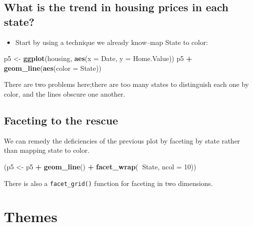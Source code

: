 \documentclass[]{book}
\newenvironment{Shaded}{\begin{snugshade}}{\end{snugshade}}
\newcommand{\KeywordTok}[1]{\textcolor[rgb]{0.13,0.29,0.53}{\textbf{#1}}}
\newcommand{\DataTypeTok}[1]{\textcolor[rgb]{0.13,0.29,0.53}{#1}}
\newcommand{\DecValTok}[1]{\textcolor[rgb]{0.00,0.00,0.81}{#1}}
\newcommand{\StringTok}[1]{\textcolor[rgb]{0.31,0.60,0.02}{#1}}
\newcommand{\OperatorTok}[1]{\textcolor[rgb]{0.81,0.36,0.00}{\textbf{#1}}}
\newcommand{\NormalTok}[1]{#1}
\providecommand{\tightlist}{%
  \setlength{\itemsep}{0pt}\setlength{\parskip}{0pt}}
\begin{document}
\subsection{What is the trend in housing prices in each
state?}\label{what-is-the-trend-in-housing-prices-in-each-state}

\begin{itemize}
\tightlist
\item
  Start by using a technique we already know--map State to color:
\end{itemize}

\begin{Shaded}
\begin{Highlighting}[]
\NormalTok{p5 <-}\StringTok{ }\KeywordTok{ggplot}\NormalTok{(housing, }\KeywordTok{aes}\NormalTok{(}\DataTypeTok{x =}\NormalTok{ Date, }\DataTypeTok{y =}\NormalTok{ Home.Value))}
\NormalTok{p5 }\OperatorTok{+}\StringTok{ }\KeywordTok{geom_line}\NormalTok{(}\KeywordTok{aes}\NormalTok{(}\DataTypeTok{color =}\NormalTok{ State))  }
\end{Highlighting}
\end{Shaded}

There are two problems here;there are too many states to distinguish
each one by color, and the lines obscure one another.

\subsection{Faceting to the rescue}\label{faceting-to-the-rescue}

We can remedy the deficiencies of the previous plot by faceting by state
rather than mapping state to color.

\begin{Shaded}
\begin{Highlighting}[]
\NormalTok{(p5 <-}\StringTok{ }\NormalTok{p5 }\OperatorTok{+}\StringTok{ }\KeywordTok{geom_line}\NormalTok{() }\OperatorTok{+}
\StringTok{   }\KeywordTok{facet_wrap}\NormalTok{(}\OperatorTok{~}\NormalTok{State, }\DataTypeTok{ncol =} \DecValTok{10}\NormalTok{))}
\end{Highlighting}
\end{Shaded}

There is also a \texttt{facet\_grid()} function for faceting in two
dimensions.

\section{Themes}\label{themes}
\end{document}
